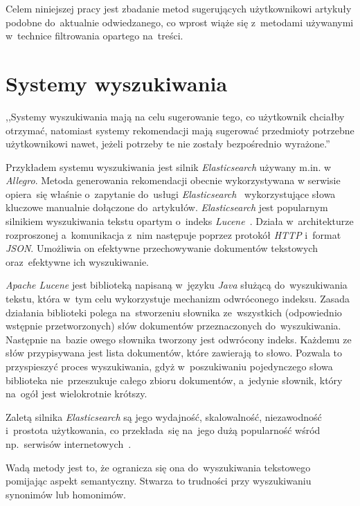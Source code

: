 \documentclass[pl]{minipw} %
\begin{document}
Celem niniejszej pracy jest zbadanie metod sugerujących użytkownikowi artykuły podobne do~aktualnie odwiedzanego, co wprost wiąże się z~metodami używanymi w~technice filtrowania opartego na~treści.

\section{Systemy wyszukiwania}

,,Systemy wyszukiwania mają na celu sugerowanie tego, co użytkownik chciałby otrzymać, natomiast systemy rekomendacji mają sugerować przedmioty potrzebne użytkownikowi nawet, jeżeli potrzeby te nie zostały bezpośrednio wyrażone.''

Przykładem systemu wyszukiwania jest silnik \textit{Elasticsearch} używany m.in. w \textit{Allegro}. Metoda generowania rekomendacji obecnie wykorzystywana w serwisie opiera~się właśnie o~zapytanie do~usługi \textit{Elasticsearch}~\cite{elastic} wykorzystujące słowa kluczowe manualnie dołączone do~artykułów. \textit{Elasticsearch} jest popularnym silnikiem wyszukiwania tekstu opartym o~indeks \textit{Lucene}~\cite{lucene}. Działa w~architekturze rozproszonej a~komunikacja z~nim następuje poprzez protokół \textit{HTTP} i~format \textit{JSON}. Umożliwia on efektywne przechowywanie dokumentów tekstowych oraz~efektywne ich wyszukiwanie.

\textit{Apache Lucene} jest biblioteką napisaną w~języku \textit{Java} służącą do~wyszukiwania tekstu, która w~tym celu wykorzystuje mechanizm odwróconego indeksu. Zasada działania biblioteki polega na~stworzeniu słownika ze~wszystkich (odpowiednio wstępnie przetworzonych) słów dokumentów przeznaczonych do~wyszukiwania. Następnie na~bazie owego słownika tworzony jest odwrócony indeks. Każdemu ze słów przypisywana jest lista dokumentów, które zawierają to słowo. Pozwala to przyspieszyć proces wyszukiwania, gdyż w~poszukiwaniu pojedynczego słowa biblioteka nie~przeszukuje całego zbioru dokumentów, a~jedynie słownik, który na~ogół jest wielokrotnie krótszy.

Zaletą silnika \textit{Elasticsearch} są jego wydajność, skalowalność, niezawodność i~prostota użytkowania, co przekłada~się na~jego dużą popularność wśród np.~serwisów internetowych~\cite{elastic_companies}.

Wadą metody jest to, że ogranicza się ona do~wyszukiwania tekstowego pomijając aspekt semantyczny. Stwarza to trudności przy wyszukiwaniu synonimów lub homonimów.
\end{document}
